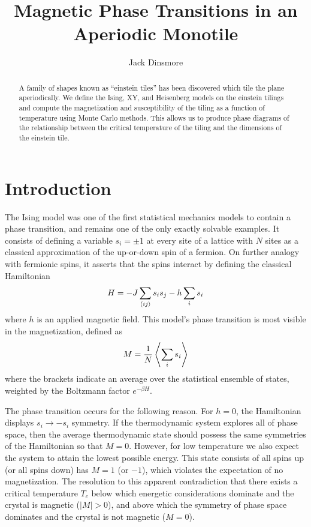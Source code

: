 \documentclass[
  amsmath,
  amssymb,
  aps,
  twocolumn,
  nofootinbib,
  floatfix,
]{revtex4-2}
\begin{document}
\title{Magnetic Phase Transitions in an Aperiodic Monotile}
\author{Jack Dinsmore}

\begin{abstract}
  A family of shapes known as ``einstein tiles'' has been discovered which tile the plane aperiodically. We define the Ising, XY, and Heisenberg models on the einstein tilings and compute the magnetization and susceptibility of the tiling as a function of temperature using Monte Carlo methods. This allows us to produce phase diagrams of the relationship between the critical temperature of the tiling and the dimensions of the einstein tile.
\end{abstract}

\maketitle

\section{Introduction}
The Ising model was one of the first statistical mechanics models to contain a phase transition, and remains one of the only exactly solvable examples. It consists of defining a variable $s_i = \pm 1$ at every site of a lattice with $N$ sites as a classical approximation of the up-or-down spin of a fermion. On further analogy with fermionic spins, it asserts that the spins interact by defining the classical Hamiltonian
\begin{equation}
  H = -J \sum_{\braket{ij}} s_i s_j - h \sum_i s_i
  \label{eqn:ising}
\end{equation}
where $h$ is an applied magnetic field. This model's phase transition is most visible in the magnetization, defined as
\begin{equation}
  M = \frac{1}{N}\Braket{\sum_{i} s_i}
  \label{eqn:magnetization}
\end{equation}
where the brackets indicate an average over the statistical ensemble of states, weighted by the Boltzmann factor $e^{-\beta H}$.

The phase transition occurs for the following reason. For $h=0$, the Hamiltonian displays $s_i\rightarrow -s_i$ symmetry. If the thermodynamic system explores all of phase space, then the average thermodynamic state should possess the same symmetries of the Hamiltonian so that $M=0$. However, for low temperature we also expect the system to attain the lowest possible energy. This state consists of all spins up (or all spins down) has $M = 1$ (or $-1$), which violates the expectation of no magnetization. The resolution to this apparent contradiction that there exists a critical temperature $T_c$ below which energetic considerations dominate and the crystal is magnetic ($|M|>0$), and above which the symmetry of phase space dominates and the crystal is not magnetic ($M = 0$).
\end{document}
